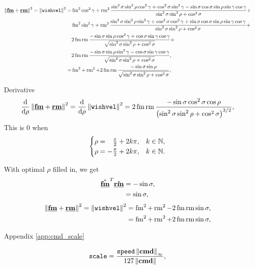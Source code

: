 \begin{align*}
\norm{\vec{\flat{\fmove}} + \vec{\flat{\rmove}}}^2 = \norm{\texttt{wishvel}}^2 = &\fmove^2 \cos^2\gamma + \rmove^2 \frac{\sin^2\sigma\sin^2\rho\cos^2\gamma + \cos^2\sigma\sin^2\gamma - \sin\sigma\cos\sigma\sin\rho\sin\gamma\cos\gamma}{\sin^2\sigma\sin^2\rho + \cos^2\sigma} +\\
&\fmove^2 \sin^2\gamma + \rmove^2 \frac{\sin^2\sigma\sin^2\rho\sin^2\gamma + \cos^2\sigma\cos^2\gamma + \sin\sigma\cos\sigma\sin\rho\sin\gamma\cos\gamma}{\sin^2\sigma\sin^2\rho + \cos^2\sigma} +\\
&2\fmove\rmove\frac{-\sin\sigma\sin\rho\cos^2\gamma + \cos\sigma\sin\gamma\cos\gamma}{\sqrt{\sin^2\sigma\sin^2\rho + \cos^2\sigma}} +\\
&2\fmove\rmove\frac{-\sin\sigma\sin\rho\sin^2\gamma - \cos\sigma\sin\gamma\cos\gamma}{\sqrt{\sin^2\sigma\sin^2\rho + \cos^2\sigma}},\\
%
= &\fmove^2 + \rmove^2 + 2\fmove\rmove\frac{-\sin\sigma\sin\rho}{\sqrt{\sin^2\sigma\sin^2\rho + \cos^2\sigma}},
\end{align*}

Derivative
\begin{align*}
\frac{\mathrm{d}}{\mathrm{d}\rho} \norm{\vec{\flat{\fmove}} + \vec{\flat{\rmove}}}^2 = \frac{\mathrm{d}}{\mathrm{d}\rho} \norm{\texttt{wishvel}}^2 = 2\fmove\rmove\frac{-\sin\sigma\cos^2\sigma\cos\rho}{\left( \sin^2\sigma\sin^2\rho + \cos^2\sigma \right)^{3/2}},
\end{align*}
This is $0$ when
\[
\begin{cases}
	\rho = \hphantom{-}\frac{\pi}{2} + 2k\pi, &k \in \mathbb{N},\\
	\rho = -\frac{\pi}{2} + 2k\pi, &k \in \mathbb{N}.
\end{cases}
\]

With optimal $\rho$ filled in, we get
\begin{align*}
\uvec{\flat{\fmove}}^T \uvec{\flat{\rmove}} &= -\sin\sigma,\\
&= \sin\sigma,
\end{align*}
\begin{align*}
\norm{\vec{\flat{\fmove}} + \vec{\flat{\rmove}}}^2 = \norm{\texttt{wishvel}}^2 &= \fmove^2 + \rmove^2 - 2\fmove\rmove\sin\sigma,\\
&= \fmove^2 + \rmove^2 + 2\fmove\rmove\sin\sigma,
\end{align*}

Appendix \ref{app:cmd_scale}

\begin{align*}
\texttt{scale} = \frac{\texttt{speed}\left\lVert\boldsymbol{\operatorname{cmd}}\right\rVert_{\infty}}{127\left\lVert\boldsymbol{\operatorname{cmd}}\right\rVert},
\end{align*}

